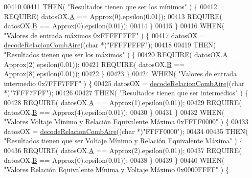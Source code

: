 \begin{DoxyCode}
{{{00410 
00411             THEN( \textcolor{stringliteral}{"Resultados tienen que ser los mínimos"} ) \{
00412                 REQUIRE( datosOX.\hyperlink{structOxigenoResponse_a068c403e5746226cf22bb020b4c786d3}{A} == Approx(0).epsilon(0.01));
00413                 REQUIRE( datosOX.\hyperlink{structOxigenoResponse_a96b19152dd001e19d1351e2d97f22736}{B} == Approx(0).epsilon(0.01));
00414             \}
00415         \}
00416         WHEN( \textcolor{stringliteral}{"Valores de entrada máximos 0xFFFFFFFF"} ) \{
00417             datosOX = \hyperlink{decoders_8cpp_a363bd4f505969098be58a175f02b9b50}{decodeRelacionCombAire}((\textcolor{keywordtype}{char} *)\textcolor{stringliteral}{"FFFFFFFF"});
00418 
00419             THEN( \textcolor{stringliteral}{"Resultados tienen que ser los máximos"} ) \{
00420                 REQUIRE( datosOX.\hyperlink{structOxigenoResponse_a068c403e5746226cf22bb020b4c786d3}{A} == Approx(2).epsilon(0.01));
00421                 REQUIRE( datosOX.\hyperlink{structOxigenoResponse_a96b19152dd001e19d1351e2d97f22736}{B} == Approx(8).epsilon(0.01));
00422             \}
00423         \}
00424         WHEN( \textcolor{stringliteral}{"Valores de entrada intermedio 0x7FFF7FFF"} ) \{
00425             datosOX = \hyperlink{decoders_8cpp_a363bd4f505969098be58a175f02b9b50}{decodeRelacionCombAire}((\textcolor{keywordtype}{char} *)\textcolor{stringliteral}{"7FFF7FFF"});
00426 
00427             THEN( \textcolor{stringliteral}{"Resultados tienen que ser intermedios"} ) \{
00428                 REQUIRE( datosOX.\hyperlink{structOxigenoResponse_a068c403e5746226cf22bb020b4c786d3}{A} == Approx(1).epsilon(0.01));
00429                 REQUIRE( datosOX.\hyperlink{structOxigenoResponse_a96b19152dd001e19d1351e2d97f22736}{B} == Approx(4).epsilon(0.01));
00430             \}
00431         \}
00432         WHEN( \textcolor{stringliteral}{"Valores Voltaje Mínimo y Relación Equivalente Máxima 0xFFFF0000"} ) \{
00433             datosOX = \hyperlink{decoders_8cpp_a363bd4f505969098be58a175f02b9b50}{decodeRelacionCombAire}((\textcolor{keywordtype}{char} *)\textcolor{stringliteral}{"FFFF0000"});
00434 
00435             THEN( \textcolor{stringliteral}{"Resultados tienen que ser Voltaje Mínimo y Relación Equivalente Máxima"} ) \{
00436                 REQUIRE( datosOX.\hyperlink{structOxigenoResponse_a068c403e5746226cf22bb020b4c786d3}{A} == Approx(2).epsilon(0.01));
00437                 REQUIRE( datosOX.\hyperlink{structOxigenoResponse_a96b19152dd001e19d1351e2d97f22736}{B} == Approx(0).epsilon(0.01));
00438             \}
00439         \}
00440         WHEN( \textcolor{stringliteral}{"Valores Relación Equivalente Mínima y Voltaje Máximo 0x0000FFFF"} ) \{
}}}
\end{DoxyCode}
